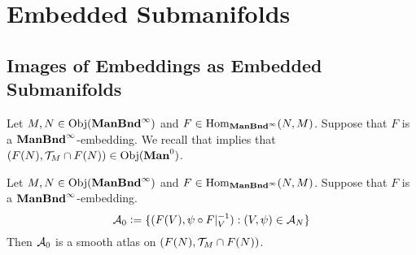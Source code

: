\documentclass{book}
\begin{document}
	\newpage
	\section{Embedded Submanifolds}
	
	\subsection{Images of Embeddings as Embedded Submanifolds}
	
	\begin{note}
		Let $M, N \in \operatorname{Obj}(\operatorname*{\text{\textbf{ManBnd}}^{\infty}})$ and  $F \in \operatorname{Hom}_{\operatorname*{\text{\textbf{ManBnd}}^{\infty}}}(N, M)$. Suppose that $F$ is a  $\operatorname*{\text{\textbf{ManBnd}}^{\infty}}$-embedding. We recall that  implies that $(F(N), \MT_M \cap F(N)) \in \Obj(\Man0)$.
	\end{note}
	
	\begin{ex} 
		Let $M, N \in \operatorname{Obj}(\operatorname*{\text{\textbf{ManBnd}}^{\infty}})$ and  $F \in \operatorname{Hom}_{\operatorname*{\text{\textbf{ManBnd}}^{\infty}}}(N, M)$. Suppose that $F$ is a  $\operatorname*{\text{\textbf{ManBnd}}^{\infty}}$-embedding. 
		$$\mathcal{A}_0 \vcentcolon= \{(F(V), \psi \circ F|_V^{-1}): (V, \psi) \in \mathcal{A}_N\}$$
		Then $\mathcal{A}_0$ is a smooth atlas on $(F(N), \mathcal{T}_M \cap F(N))$.
	\end{ex}
	
\end{document}
